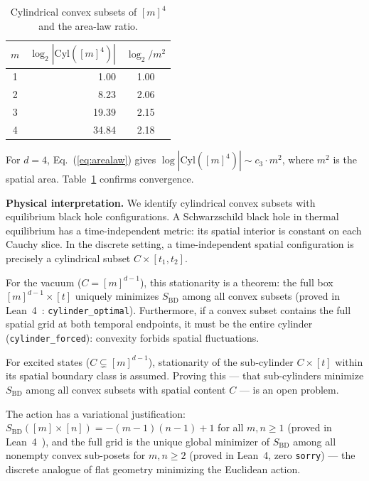\documentclass[aps,prl,twocolumn,superscriptaddress]{revtex4-2}
\begin{document}
\begin{table}[b]
\caption{Cylindrical convex subsets of $[m]^4$ and the area-law ratio.}
\label{tab:area}
\begin{ruledtabular}
\begin{tabular}{crc}
$m$ & $\log_2|\mathrm{Cyl}([m]^4)|$ & $\log_2/m^2$ \\
\midrule
1 & 1.00 & 1.00 \\
2 & 8.23 & 2.06 \\
3 & 19.39 & 2.15 \\
4 & 34.84 & 2.18 \\
\end{tabular}
\end{ruledtabular}
\end{table}

For $d=4$, Eq.~(\ref{eq:arealaw}) gives
$\log|\mathrm{Cyl}([m]^4)| \sim c_3 \cdot m^2$, where $m^2$ is the
spatial area. Table~\ref{tab:area} confirms convergence.

\textbf{Physical interpretation.} We identify cylindrical convex
subsets with equilibrium black hole configurations. A Schwarzschild
black hole in thermal equilibrium has a time-independent metric: its
spatial interior is constant on each Cauchy slice. In the discrete
setting, a time-independent spatial configuration is precisely a
cylindrical subset $C \times [t_1, t_2]$.

For the vacuum ($C = [m]^{d-1}$), this stationarity is a theorem:
the full box $[m]^{d-1} \times [t]$ uniquely minimizes
$S_{\mathrm{BD}}$ among all convex subsets
(proved in Lean~4~\cite{leanrepo}: \texttt{cylinder\_optimal}).
Furthermore, if a convex subset contains the full spatial grid
at both temporal endpoints, it must be the entire cylinder
(\texttt{cylinder\_forced}): convexity forbids spatial fluctuations.

For excited states ($C \subsetneq [m]^{d-1}$), stationarity of the
sub-cylinder $C \times [t]$ within its spatial boundary class is
assumed. Proving this --- that sub-cylinders minimize
$S_{\mathrm{BD}}$ among all convex subsets with spatial content
$C$ --- is an open problem.

The action has a variational justification: $S_{\mathrm{BD}}([m] \times [n])
= -(m-1)(n-1) + 1$ for all $m, n \geq 1$ (proved in Lean~4~\cite{leanrepo}),
and the full grid is the unique global minimizer of $S_{\mathrm{BD}}$
among all nonempty convex sub-posets for $m, n \geq 2$
(proved in Lean~4, zero \texttt{sorry}) ---
the discrete analogue of flat geometry minimizing the Euclidean action.
\end{document}
